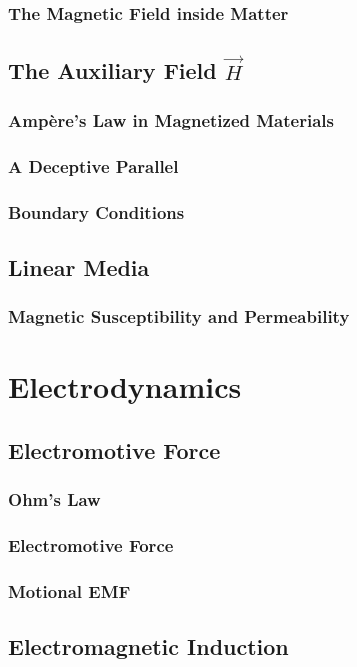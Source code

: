 \documentclass{article}
\begin{document}
\subsubsection{The Magnetic Field inside Matter}

\subsection{The Auxiliary Field $\vec{H}$}
\subsubsection{Amp\`ere's Law in Magnetized Materials}
\subsubsection{A Deceptive Parallel}
\subsubsection{Boundary Conditions}

\subsection{Linear Media}
\subsubsection{Magnetic Susceptibility and Permeability}


\section{Electrodynamics}
\subsection{Electromotive Force}
\subsubsection{Ohm's Law}
\subsubsection{Electromotive Force}
\subsubsection{Motional EMF}

\subsection{Electromagnetic Induction}
\end{document}
